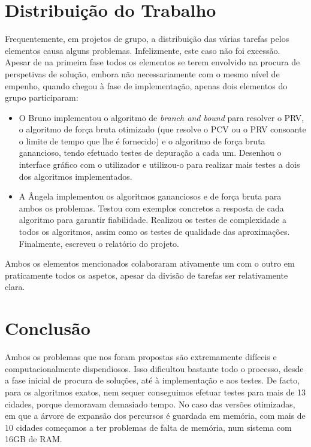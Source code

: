 \documentclass[12pt,a4paper,reqno]{report}
\numberwithin{equation}{section}
\begin{document}
\chapter{Distribuição do Trabalho}

Frequentemente, em projetos de grupo, a distribuição das várias tarefas pelos elementos causa alguns problemas. Infelizmente, este caso não foi excessão. Apesar de na primeira fase todos os elementos se terem envolvido na procura de perspetivas de solução, embora não necessariamente com o mesmo nível de empenho, quando chegou à fase de implementação, apenas dois elementos do grupo participaram:
\begin{itemize}
	\item O Bruno implementou o algoritmo de \emph{branch and bound} para resolver o PRV, o algoritmo de força bruta otimizado (que resolve o PCV ou o PRV consoante o limite de tempo que lhe é fornecido) e o algoritmo de força bruta ganancioso, tendo efetuado testes de depuração a cada um. Desenhou o interface gráfico com o utilizador e utilizou-o para realizar mais testes a dois dos algoritmos implementados.
	\item A Ângela implementou os algoritmos gananciosos e de força bruta para ambos os problemas. Testou com exemplos concretos a resposta de cada algoritmo para garantir fiabilidade. Realizou os testes de complexidade a todos os algoritmos, assim como os testes de qualidade das aproximações. Finalmente, escreveu o relatório do projeto.
\end{itemize}
Ambos os elementos mencionados colaboraram ativamente um com o outro em praticamente todos os aspetos, apesar da divisão de tarefas ser relativamente clara.

\chapter{Conclusão}

Ambos os problemas que nos foram propostas são extremamente difíceis e computacionalmente dispendiosos. Isso dificultou bastante todo o processo, desde a fase inicial de procura de soluções, até à implementação e aos testes. De facto, para os algoritmos exatos, nem sequer conseguimos efetuar testes para mais de 13 cidades, porque demoravam demasiado tempo. No caso das versões otimizadas, em que a árvore de expansão dos percursos é guardada em memória, com mais de 10 cidades começamos a ter problemas de falta de memória, num sistema com 16GB de RAM.
\end{document}

